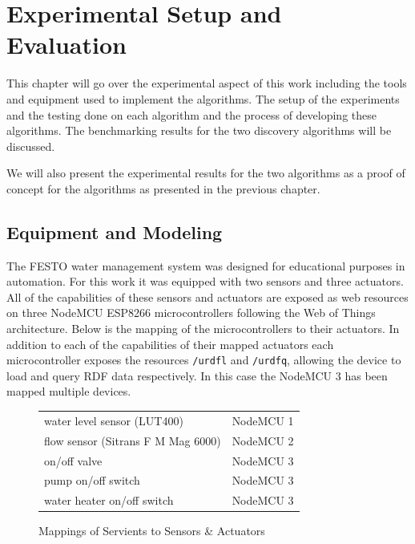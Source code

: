 \chapter{Experimental Setup and Evaluation}

This chapter will go over the experimental aspect of this work including the tools and equipment used to implement the algorithms. The setup of the experiments and the testing done on each algorithm and the process of developing these algorithms. The benchmarking results for the two discovery algorithms will be discussed.

We will also present the experimental results for the two algorithms as a proof of concept for the algorithms as presented in the previous chapter.



\section{Equipment and Modeling}
The FESTO water management system was designed for educational purposes in automation. For this work it was equipped with two sensors and three actuators. All of the capabilities of these sensors and actuators are exposed as web resources on three NodeMCU ESP8266 microcontrollers following the Web of Things architecture. Below is the mapping of the microcontrollers to their actuators. In addition to each of the capabilities of their mapped actuators each microcontroller exposes the resources \texttt{/urdfl} and \texttt{/urdfq}, allowing the device to load and query RDF data respectively. In this case the NodeMCU 3 has been mapped multiple devices.

\vspace{1cm}
\begin{figure}[ht]
\centering
\begin{tabular}{l | l}
  water level sensor (LUT400) & NodeMCU 1 \\
  flow sensor (Sitrans F M Mag 6000) & NodeMCU 2 \\
  on/off valve & NodeMCU 3 \\
  pump on/off switch & NodeMCU 3 \\
  water heater on/off switch & NodeMCU 3 \\
\end{tabular}
  \caption{Mappings of Servients to Sensors \& Actuators}
  \label{table:mappings}
\end{figure}

